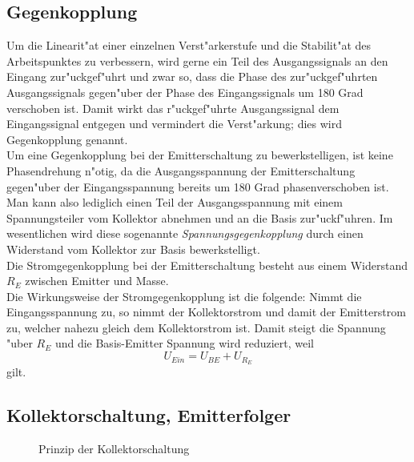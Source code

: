 \documentclass[german, 10pt, a4paper, headsepline]{scrreprt}
\theoremstyle{remark}
\begin{document}
\subsection{Gegenkopplung}

Um die Linearit"at einer einzelnen Verst"arkerstufe und die Stabilit"at des Arbeitspunktes zu verbessern, wird gerne ein Teil des Ausgangssignals an den Eingang zur"uckgef"uhrt und zwar so, dass die Phase des zur"uckgef"uhrten Ausgangssignals gegen"uber der Phase des Eingangssignals um 180 Grad verschoben ist. Damit wirkt das r"uckgef"uhrte Ausgangssignal dem Eingangssignal entgegen und vermindert die Verst"arkung; dies wird Gegenkopplung genannt.\\

Um eine Gegenkopplung bei der Emitterschaltung zu bewerkstelligen, ist keine Phasen\-drehung n"otig, da die Ausgangsspannung der Emitterschaltung gegen"uber der Eingangsspannung bereits um 180 Grad phasenverschoben ist. Man kann also lediglich einen Teil der Ausgangsspannung mit einem Spannungsteiler vom Kollektor abnehmen und an die Basis zur"uckf"uhren. Im wesentlichen wird diese sogenannte \textit{Spannungsgegenkopplung} durch einen Widerstand vom Kollektor zur Basis bewerkstelligt.\\

Die Stromgegenkopplung bei der Emitterschaltung besteht aus einem Widerstand $R_E$ zwischen Emitter und Masse.\\

Die Wirkungsweise der Stromgegenkopplung ist die folgende: Nimmt die Eingangsspannung zu, so nimmt der Kollektorstrom und damit der Emitterstrom zu, welcher nahezu gleich dem Kollektorstrom ist. Damit steigt die Spannung "uber $R_E$ und die Basis-Emitter Spannung wird reduziert, weil
\begin{displaymath}
	U_{Ein} = U_{BE} + U_{R_E}
\end{displaymath}
gilt.

\subsection{Kollektorschaltung, Emitterfolger}


\begin{figure}[hbt]
 
 \centerline{\box\graph}
 \caption{Prinzip der Kollektorschaltung}
 \label{kollektorschaltung}
\end{figure}
\end{document}
